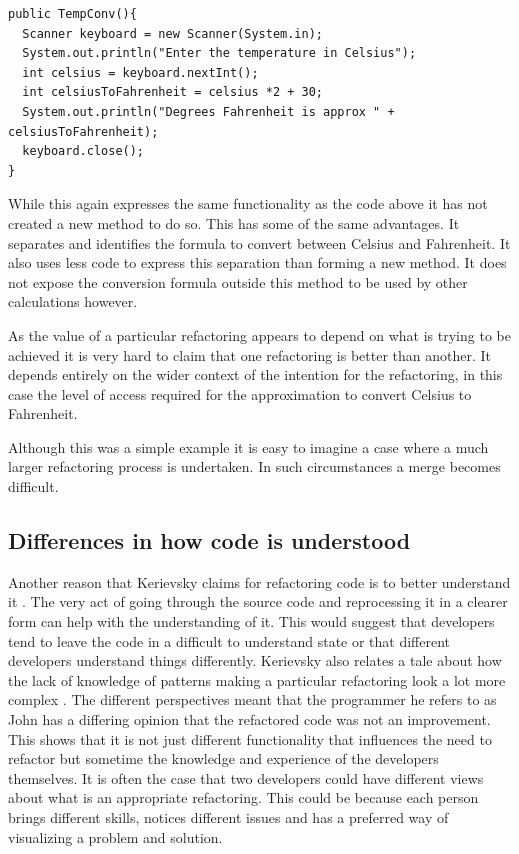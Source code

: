 \documentclass[12pt]{CRPITStyle}
\renewcommand{\cite}{\citep}
\begin{document}
\begin{verbatim}
public TempConv(){
  Scanner keyboard = new Scanner(System.in);
  System.out.println("Enter the temperature in Celsius");
  int celsius = keyboard.nextInt();
  int celsiusToFahrenheit = celsius *2 + 30;
  System.out.println("Degrees Fahrenheit is approx " + celsiusToFahrenheit);
  keyboard.close();
}
\end{verbatim}

While this again expresses the same functionality as the code above it has not created a new method to do so. This has some of the same advantages. It separates and identifies the formula to convert between Celsius and Fahrenheit. It also uses less code to express this separation than forming a new method. It does not expose the conversion formula outside this method to be used by other calculations however.

As the value of a particular refactoring appears to depend on what is trying to be achieved it is very hard to claim that one refactoring is better than another. It depends entirely on the wider context of the intention for the refactoring, in this case the level of access required for the approximation to convert Celsius to Fahrenheit.

Although this was a simple example it is easy to imagine a case where a much larger refactoring process is undertaken. In such circumstances a merge becomes difficult. 
\subsection{Differences in how code is understood}
Another reason that Kerievsky claims for refactoring code is to better understand it \cite{Kerievsky2004}. The very act of going through the source code and reprocessing it in a clearer form can help with the understanding of it. This would suggest that developers tend to leave the code in a difficult to understand state or that different developers understand things differently.
Kerievsky also relates a tale about how the lack of knowledge of patterns making a particular refactoring look a lot more complex \cite{Kerievsky2004}. The different perspectives meant that the programmer he refers to as John has a differing opinion that the refactored code was not an improvement. This shows that it is not just different functionality that influences the need to refactor but sometime the knowledge and experience of the developers themselves. It is often the case that two developers could have different views about what is an appropriate refactoring. This could be because each person brings different skills, notices different issues and has a preferred way of visualizing a problem and solution.
\end{document}

